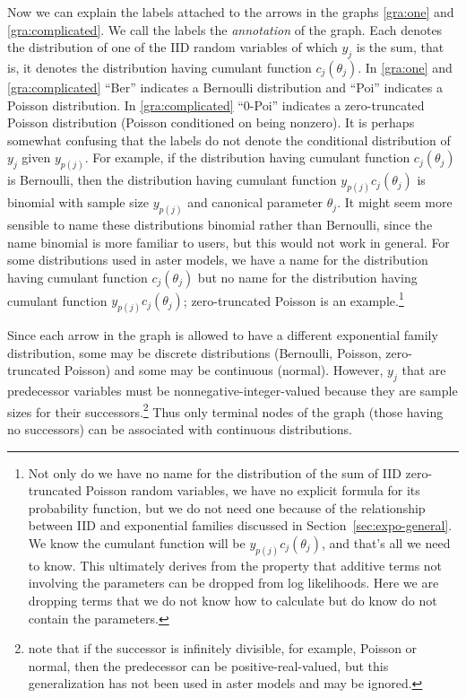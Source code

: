 \documentclass[11pt]{article}
\begin{document}
Now we can explain the labels attached to the arrows in the graphs
\eqref{gra:one} and \eqref{gra:complicated}.  We call the labels
the \emph{annotation} of the graph.
Each denotes the distribution of one
of the IID random variables of which $y_j$ is the sum, that is,
it denotes the distribution
having cumulant function $c_j(\theta_j)$.
In \eqref{gra:one} and \eqref{gra:complicated}
``Ber'' indicates a Bernoulli distribution
and ``Poi'' indicates a Poisson distribution.
In \eqref{gra:complicated} ``0-Poi'' indicates a zero-truncated Poisson
distribution (Poisson conditioned on being nonzero).
It is perhaps somewhat
confusing that the labels do not denote the conditional distribution of $y_j$
given $y_{p(j)}$.  For example, if the distribution having cumulant function
$c_j(\theta_j)$ is Bernoulli, then the distribution having
cumulant function $y_{p(j)} c_j(\theta_j)$ is binomial with sample size
$y_{p(j)}$ and canonical parameter $\theta_j$.  It might seem more sensible
to name these distributions binomial rather than Bernoulli, since the name
binomial is more familiar to users, but this would not work in general.
For some distributions used in aster models, we have a name for
the distribution having cumulant function $c_j(\theta_j)$ but no name
for the distribution having cumulant function $y_{p(j)} c_j(\theta_j)$;
zero-truncated Poisson is an example.\footnote{Not only do we have no name
for the distribution of the sum of IID zero-truncated Poisson random variables,
we have no explicit formula for its probability function, but we do not need
one because of the relationship between IID and exponential families discussed
in Section~\ref{sec:expo-general}.  We know the cumulant function will be
$y_{p(j)} c_j(\theta_j)$, and that's all we need to know.  This ultimately
derives from the property that additive terms not involving the parameters can
be dropped from log likelihoods.  Here we are dropping terms that we do not
know how to calculate but do know do not contain the parameters.}

Since each arrow in the graph is allowed to have a different exponential
family distribution, some may be discrete distributions (Bernoulli, Poisson,
zero-truncated Poisson) and some may be continuous (normal).  However,
$y_j$ that are predecessor variables must be nonnegative-integer-valued
because they are sample sizes for their successors.\footnote{\citet{gws}
note that if the successor is infinitely divisible, for example, Poisson
or normal, then the predecessor can be positive-real-valued, but this
generalization has not been used in aster models
and may be ignored.\label{foot:infinitely-divisible}}
Thus only terminal nodes of the graph (those having no successors)
can be associated with continuous distributions.
\end{document}

